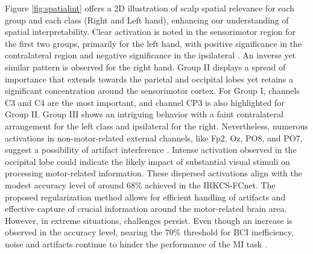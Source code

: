 Figure \cref{fig:spatialint} offers a 2D illustration of scalp spatial relevance for each group and each class (Right and Left hand), enhancing our understanding of spatial interpretability. Clear activation is noted in the sensorimotor region for the first two groups, primarily for the left hand, with positive significance in the contralateral region and negative significance in the ipsilateral \cite{van2021frontal}. An inverse yet similar pattern is observed for the right hand. Group II displays a spread of importance that extends towards the parietal and occipital lobes yet retains a significant concentration around the sensorimotor cortex. For Group I, channels C3 and C4 are the most important, and channel CP3 is also highlighted for Group II. Group III shows an intriguing behavior with a faint contralateral arrangement for the left class and ipsilateral for the right. Nevertheless, numerous activations in non-motor-related external channels, like Fp2, Oz, PO8, and PO7, suggest a possibility of artifact interference \cite{collazos2023posthoc}. Intense activation observed in the occipital lobe could indicate the likely impact of substantial visual stimuli on processing motor-related information. These dispersed activations align with the modest accuracy level of around $68\%$ achieved in the IRKCS-FCnet. The proposed regularization method allows for efficient handling of artifacts and effective capture of crucial information around the motor-related brain area. However, in extreme situations, challenges persist. Even though an increase is observed in the accuracy level, nearing the $70\%$ threshold for BCI inefficiency, noise and artifacts continue to hinder the performance of the MI task \cite{vidaurre2021improving}.


